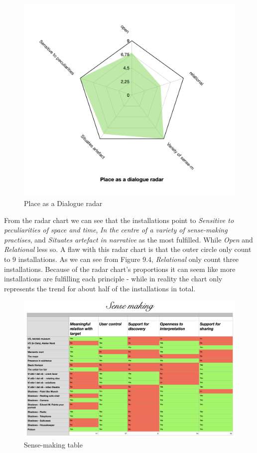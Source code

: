 \begin{figure}[H]
\includegraphics[width=12.5cm]{pictures/analysis/place_radar.png}
\caption{Place as a Dialogue radar}
\centering 
\end{figure}

From the radar chart we can see that the installations point to \textit{Sensitive to peculiarities of space and time}, \textit{In the centre of a variety of sense-making practises}, and \textit{Situates artefact in narrative} as the most fulfilled. While \textit{Open} and \textit{Relational} less so. A flaw with this radar chart is that the outer circle only count to 9 installations. As we can see from Figure 9.4, \textit{Relational} only count three installations. Because of the radar chart's proportions it can seem like more installations are fulfilling each principle - while in reality the chart only represents the trend for about half of the installations in total. 

\begin{figure}[H]
\includegraphics[width=20cm, angle=90]{pictures/analysis/sense.png}
\caption{Sense-making table}
\centering 
\end{figure}

